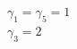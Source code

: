\documentclass[preview]{standalone}
\begin{document}
\begin{center}
$\gamma_1 = \gamma_5 = 1$\\$\gamma_3 = 2$
\end{center}
\end{document}

